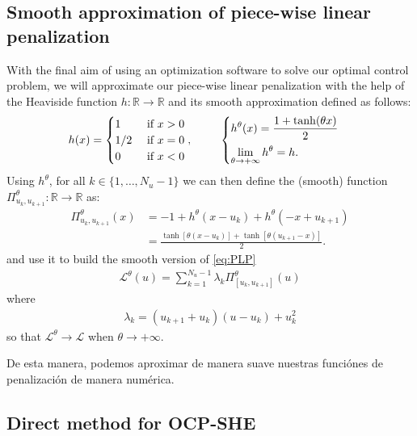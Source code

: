 \documentclass[twocolumn]{autart}    %
\begin{document}
\subsection{Smooth approximation of piece-wise linear penalization}

With the final aim of using an optimization software to solve our optimal control problem, we will approximate our piece-wise linear penalization with the help of the Heaviside function $h:\mathbb{R} \rightarrow \mathbb{R}$ and its smooth approximation defined as follows: 
\begin{align*}
    h(x) = \begin{cases}
        1 & \text{ if } x > 0 \\
		1/2 & \text{ if } x = 0\\
		 0 & \text{ if } x < 0
    \end{cases},    
    \hspace{2.5em} 
    \begin{cases}
        \displaystyle h^\theta(x) = \frac{1 + \tanh(\theta x)}{2} \\[7pt] \displaystyle \lim_{\theta\to +\infty} h^\theta = h.
    \end{cases}
\end{align*}
Using $h^\theta$, for all $k \in \{1,\dots,N_u-1\}$ we can then define the (smooth) function $\Pi_{u_k,u_{k+1}}^\theta:\mathbb{R} \rightarrow \mathbb{R}$ as:
\begin{align*}
    \Pi_{u_k,u_{k+1}}^\theta(x) &= - 1 + h^\theta(x-u_k) + h^\theta(-x+u_{k+1}) 
    \\[5pt]
    &= \frac{\tanh[\theta(x-u_k)] + \tanh[\theta (u_{k+1}-x)]}{2}.
\end{align*}
and use it to build the smooth version of \eqref{eq:PLP}
\begin{align*}
    \mathcal{L}^\theta(u) = \sum_{k = 1}^{N_u-1} \lambda_k \Pi^\theta_{[u_k,u_{k+1}]}(u)
\end{align*}
where 
\begin{gather}
	\lambda_k = (u_{k+1}+u_{k}) (u-u_k) + u_k^2 
\end{gather}
so that $\mathcal{L}^\theta \rightarrow \mathcal{L}$ when $\theta \rightarrow +\infty$. 

\JOStart
De esta manera, podemos aproximar de manera suave nuestras funciónes de penalización de manera numérica. 
\JOEnd
\subsection{Direct method  for  OCP-SHE}
\end{document}
